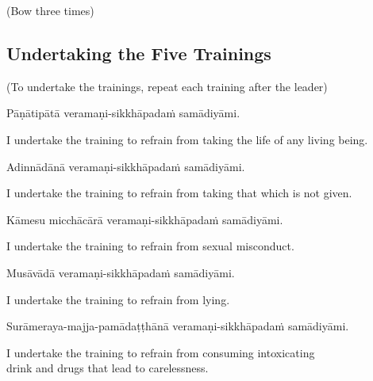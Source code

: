 \begin{center}
(Bow three times)\\
\end{center}

\subsection*{Undertaking the Five Trainings}

\begin{center}
  (To undertake the trainings, repeat each training after the leader)\\
\end{center}

Pāṇātipātā veramaṇi-sikkhāpadaṁ samādiyāmi.\\

\begin{english}
  I undertake the training
  to refrain from taking the life of any living being.\\
\end{english}

Adinnādānā veramaṇi-sikkhāpadaṁ samādiyāmi.\\

\begin{english}
  I undertake the training to refrain from taking that which is not given.\\
\end{english}

Kāmesu micchācārā veramaṇi-sikkhāpadaṁ samādiyāmi.\\

\begin{english}
  I undertake the training to refrain from sexual misconduct.\\
\end{english}

Musāvādā veramaṇi-sikkhāpadaṁ samādiyāmi.\\

\begin{english}
  I undertake the training to refrain from lying.\\
\end{english}

Surāmeraya-majja-pamādaṭṭhānā veramaṇi-sikkhāpadaṁ samādiyāmi.\\

\begin{english}
  I undertake the training to refrain from consuming intoxicating\\
  drink and drugs that lead to carelessness.\\
  \end{english}

